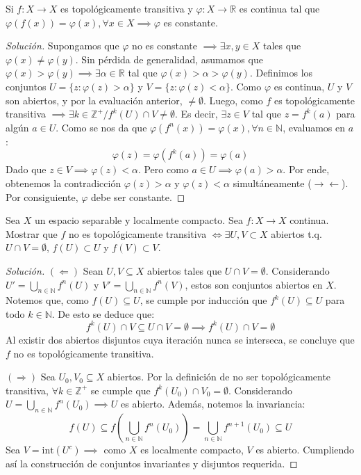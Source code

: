 \begin{ejercicio}
	Si $f: X \to X$ es topológicamente transitiva y $\varphi: X \to \mathbb{R}$ es continua tal que $\varphi(f(x)) = \varphi(x), \forall x \in X \implies \varphi$ es constante.
\end{ejercicio}
\begin{proof}[Solución]
	Supongamos que $\varphi$ no es constante $\implies \exists x, y \in X$ tales que $\varphi(x) \neq \varphi(y)$. 
	Sin pérdida de generalidad, asumamos que $\varphi(x) > \varphi(y) \implies \exists \alpha \in \mathbb{R}$ tal que $\varphi(x) > \alpha > \varphi(y)$.
	Definimos los conjuntos $U = \{z : \varphi(z) > \alpha\}$ y $V = \{z : \varphi(z) < \alpha\}$. Como $\varphi$ es continua, $U$ y $V$ son abiertos, y por la evaluación anterior, $\neq \emptyset$.
	Luego, como $f$ es topológicamente transitiva $\implies \exists k \in \mathbb{Z}^+ / f^k(U) \cap V \neq \emptyset$.
	Es decir, $\exists z \in V$ tal que $z = f^k(a)$ para algún $a \in U$. 
	Como se nos da que $\varphi(f^n(x)) = \varphi(x), \forall n \in \mathbb{N}$, evaluamos en $a$:
	$$ \varphi(z) = \varphi(f^k(a)) = \varphi(a) $$
	Dado que $z \in V \implies \varphi(z) < \alpha$. Pero como $a \in U \implies \varphi(a) > \alpha$. Por ende, obtenemos la contradicción $\varphi(z) > \alpha$ y $\varphi(z) < \alpha$ simultáneamente ($\rightarrow \leftarrow$).
	Por consiguiente, $\varphi$ debe ser constante.
\end{proof}

\begin{ejercicio}
	Sea $X$ un espacio separable y localmente compacto. Sea $f: X \to X$ continua. Mostrar que $f$ no es topológicamente transitiva $\iff \exists U, V \subset X$ abiertos t.q. $U \cap V = \emptyset$, $f(U) \subset U$ y $f(V) \subset V$.
\end{ejercicio}
\begin{proof}[Solución]
	$(\Leftarrow)$ Sean $U, V \subseteq X$ abiertos tales que $U \cap V = \emptyset$.
	Considerando $U' = \bigcup_{n \in \mathbb{N}} f^n(U)$ y $V' = \bigcup_{n \in \mathbb{N}} f^n(V)$, estos son conjuntos abiertos en $X$.
	Notemos que, como $f(U) \subseteq U$, se cumple por inducción que $f^k(U) \subseteq U$ para todo $k \in \mathbb{N}$. 
	De esto se deduce que:
	$$ f^k(U) \cap V \subseteq U \cap V = \emptyset \implies f^k(U) \cap V = \emptyset $$
	Al existir dos abiertos disjuntos cuya iteración nunca se interseca, se concluye que $f$ no es topológicamente transitiva.
	
	$(\Rightarrow)$ Sea $U_0, V_0 \subseteq X$ abiertos. Por la definición de no ser topológicamente transitiva, $\forall k \in \mathbb{Z}^+$ se cumple que $f^k(U_0) \cap V_0 = \emptyset$.
	Considerando $U = \bigcup_{n \in \mathbb{N}} f^n(U_0) \implies U$ es abierto.
	Además, notemos la invariancia: 
	$$f(U) \subseteq f\left(\bigcup_{n \in \mathbb{N}} f^n(U_0)\right) = \bigcup_{n \in \mathbb{N}} f^{n+1}(U_0) \subseteq U$$
	Sea $V = \text{int}(U^c) \implies$ como $X$ es localmente compacto, $V$ es abierto. Cumpliendo así la construcción de conjuntos invariantes y disjuntos requerida.
\end{proof}

